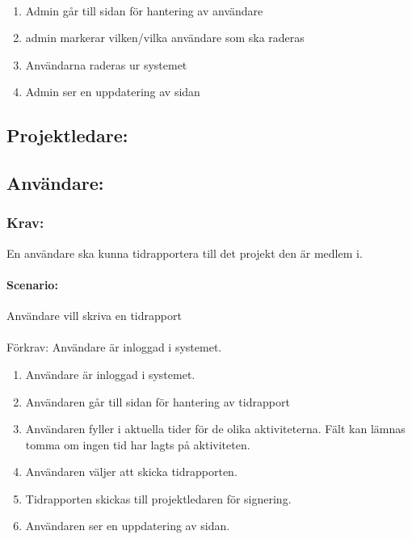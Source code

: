 \documentclass[paper=a4, fontsize=11pt,twoside]{article}
\begin{document}
\paragraph{}
\begin{enumerate}
\item Admin går till sidan för hantering av användare
\item admin markerar vilken/vilka användare som ska raderas
\item Användarna raderas ur systemet
\item Admin ser en uppdatering av sidan
\end{enumerate}

\subsection{Projektledare:}
\subsection{Användare:}
 \subsubsection{Krav:} En användare ska kunna tidrapportera till det projekt den är medlem i.
 \paragraph{Scenario:} Användare vill skriva en tidrapport
  \paragraph{ }
  Förkrav: Användare är inloggad i systemet.
 
 \begin{enumerate}
\item	Användare är inloggad i systemet.
\item 	Användaren går till sidan för hantering av tidrapport
\item 	Användaren fyller i aktuella tider för de olika aktiviteterna. Fält kan lämnas tomma om ingen tid har lagts på aktiviteten.
\item	Användaren väljer att skicka tidrapporten.
\item 	Tidrapporten skickas till projektledaren för signering.
 \item Användaren ser en uppdatering av sidan.
 	
 	
 \end{enumerate}
 
\end{document}
